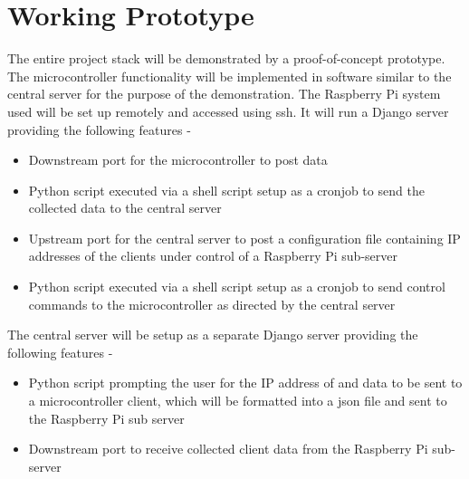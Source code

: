 \documentclass[letterpaper,11pt]{report}
\begin{document}
\newpage
\chapter{Working Prototype}\label{chapter:workingprototype}
\onehalfspacing
The entire project stack will be demonstrated by a proof-of-concept prototype. The microcontroller functionality will be implemented in software similar to the central server for the purpose of the demonstration. The Raspberry Pi system used will be set up remotely and accessed using \ac{ssh}. It will run a Django server providing the following features -
\begin{itemize}
    \item Downstream port for the microcontroller to post data
    \item Python script executed via a shell script setup as a cronjob to send the collected data to the central server
    \item Upstream port for the central server to post a configuration file containing IP addresses of the clients under control of a Raspberry Pi sub-server
    \item Python script executed via a shell script setup as a cronjob to send control commands to the microcontroller as directed by the central server
\end{itemize}
The central server will be setup as a separate Django server providing the following features -
\begin{itemize}
    \item Python script prompting the user for the IP address of and data to be sent to a microcontroller client, which will be formatted into a \ac{json} file and sent to the Raspberry Pi sub server
    \item Downstream port to receive collected client data from the Raspberry Pi sub-server
\end{itemize}

\newpage
\nocite*{}


\end{document}
